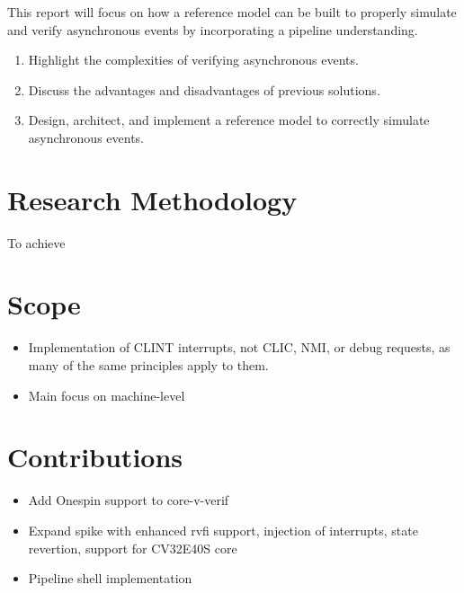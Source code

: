 This report will focus on how a reference model can be built to properly simulate and verify asynchronous events by incorporating a pipeline understanding. 

\begin{enumerate}
    \item Highlight the complexities of verifying asynchronous events.
    \item Discuss the advantages and disadvantages of previous solutions.
    \item Design, architect, and implement a reference model to correctly simulate asynchronous events.
\end{enumerate}


\section{Research Methodology}


To achieve 

\section{Scope}

\begin{itemize}
    \item Implementation of CLINT interrupts, not CLIC, NMI, or debug requests, as many of the same principles apply to them. 
    \item Main focus on machine-level 
\end{itemize}

\section{Contributions}

\begin{itemize}
    \item Add Onespin support to core-v-verif
    \item Expand spike with enhanced rvfi support, injection of interrupts, state revertion, support for CV32E40S core
    \item Pipeline shell implementation
\end{itemize}


